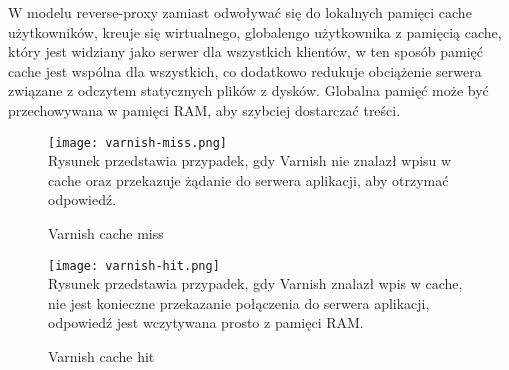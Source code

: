 W modelu reverse-proxy zamiast odwoływać się do lokalnych pamięci cache użytkowników, kreuje się wirtualnego, globalengo użytkownika z pamięcią cache, który jest widziany jako serwer dla wszystkich klientów, w ten sposób pamięć cache jest wspólna dla wszystkich, co dodatkowo redukuje obciążenie serwera związane z odczytem statycznych plików z dysków. Globalna pamięć może być przechowywana w pamięci RAM, aby szybciej dostarczać treści.

\begin{figure}[H]
  \centering
    \texttt{[image: varnish-miss.png]} \\
    Rysunek przedstawia przypadek, gdy Varnish nie znalazł wpisu w cache oraz przekazuje żądanie do serwera aplikacji, aby otrzymać odpowiedź.
  \caption[Varnish cache miss]{Varnish cache miss}
\end{figure}

\begin{figure}[H]
  \centering
    \texttt{[image: varnish-hit.png]} \\
    Rysunek przedstawia przypadek, gdy Varnish znalazł wpis w cache, nie jest konieczne przekazanie połączenia do serwera aplikacji, odpowiedź jest wczytywana prosto z pamięci RAM.
  \caption[Varnish cache hit]{Varnish cache hit}
\end{figure}
